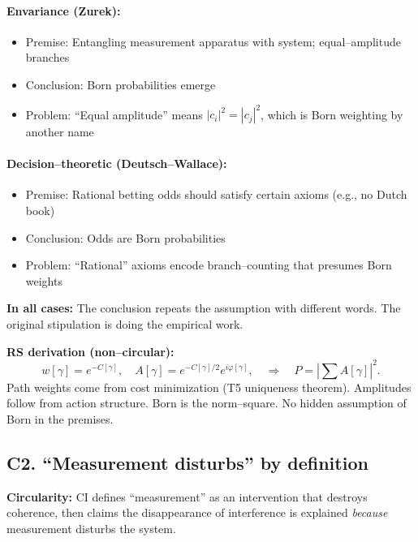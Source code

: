 \documentclass[11pt]{article}
\begin{document}
\paragraph{Envariance (Zurek):}
\begin{itemize}[nosep]
  \item Premise: Entangling measurement apparatus with system; equal--amplitude branches
  \item Conclusion: Born probabilities emerge
  \item Problem: ``Equal amplitude'' means $|c_i|^2=|c_j|^2$, which is Born weighting by another name
\end{itemize}

\paragraph{Decision--theoretic (Deutsch--Wallace):}
\begin{itemize}[nosep]
  \item Premise: Rational betting odds should satisfy certain axioms (e.g., no Dutch book)
  \item Conclusion: Odds are Born probabilities
  \item Problem: ``Rational'' axioms encode branch--counting that presumes Born weights
\end{itemize}

\textbf{In all cases:} The conclusion repeats the assumption with different words. The original stipulation is doing the empirical work.

\textbf{RS derivation (non--circular):}
\begin{equation}
  w[\gamma]=e^{-C[\gamma]}, \quad A[\gamma]=e^{-C[\gamma]/2}e^{i\varphi[\gamma]}, \quad \Rightarrow \quad P = \left|\sum A[\gamma]\right|^2.
\end{equation}
Path weights come from cost minimization (T5 uniqueness theorem). Amplitudes follow from action structure. Born is the norm--square. No hidden assumption of Born in the premises.

\subsection{C2. ``Measurement disturbs'' by definition}

\begin{warnbox}
\textbf{Circularity:} CI defines ``measurement'' as an intervention that destroys coherence, then claims the disappearance of interference is explained \emph{because} measurement disturbs the system.
\end{warnbox}
\end{document}
